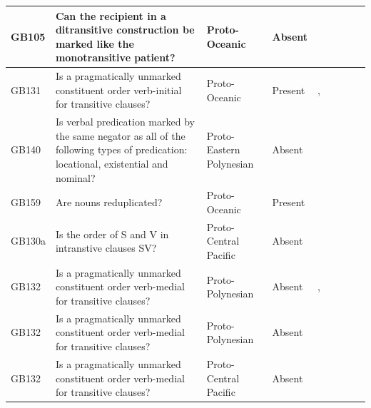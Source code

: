 \documentclass[draft,10pt]{article} %
\begin{document}
\begin{landscape}
\begin{longtable}{| p{2cm}| p{3cm}| p{2.5cm}|p{2cm}|p{2cm}|p{2cm}|p{2cm}|p{2cm}|p{2cm}|}
GB105&Can the recipient in a ditransitive construction be marked like the monotransitive patient?&Proto-Oceanic&Absent&\citet[118]{pawley1973some}& \cellcolor{hedvig_lightgreen!50}{True Negative} & \cellcolor{hedvig_yellow!50}{Half} & \cellcolor{hedvig_yellow!50}{Half} & \cellcolor{hedvig_yellow!50}{Half} \\ \hline
GB131&Is a pragmatically unmarked constituent order verb-initial for transitive clauses?&Proto-Oceanic&Present&\citet[118]{pawley1973some}, \citet[86]{lynchrosscrowley_proto_grammar_oceanic}& \cellcolor{hedvig_red!50}{False Negative} & \cellcolor{hedvig_yellow!50}{Half} & \cellcolor{hedvig_yellow!50}{False Negative} & \cellcolor{hedvig_lightgreen!50}{True Positive} \\ \hline
GB140&Is verbal predication marked by the same negator as all of the following types of predication: locational, existential and nominal?&Proto-Eastern Polynesian&Absent&\citet[130]{clark1976aspects}& \cellcolor{hedvig_lightgreen!50}{True Negative} & \cellcolor{hedvig_yellow!50}{Half} & \cellcolor{hedvig_red!50}{False Positive} & \cellcolor{hedvig_yellow!50}{Half} \\ \hline
GB159&Are nouns reduplicated?&Proto-Oceanic&Present&\citet[70]{lynchrosscrowley_proto_grammar_oceanic}& \cellcolor{hedvig_yellow!50}{Half} & \cellcolor{hedvig_yellow!50}{Half} & \cellcolor{hedvig_lightgreen!50}{True Positive} & \cellcolor{hedvig_yellow!50}{Half} \\ \hline
GB130a&Is the order of S and V in intranstive clauses SV?&Proto-Central Pacific&Absent&\citet[122]{kikusawa2002proto}& \cellcolor{hedvig_red!50}{False Positive} & \cellcolor{hedvig_yellow!50}{Half} & \cellcolor{hedvig_red!50}{False Positive} & \cellcolor{hedvig_yellow!50}{True Negative} \\ \hline
GB132&Is a pragmatically unmarked constituent order verb-medial for transitive clauses?&Proto-Polynesian&Absent&\cite[15]{chung1978}, \citet[118]{pawley1973some}& \cellcolor{hedvig_red!50}{False Positive} & \cellcolor{hedvig_yellow!50}{Half} & \cellcolor{hedvig_red!50}{False Positive} & \cellcolor{hedvig_yellow!50}{True Negative} \\ \hline
GB132&Is a pragmatically unmarked constituent order verb-medial for transitive clauses?&Proto-Polynesian&Absent&\citet[122]{kikusawa2002proto}& \cellcolor{hedvig_red!50}{False Positive} & \cellcolor{hedvig_yellow!50}{Half} & \cellcolor{hedvig_red!50}{False Positive} & \cellcolor{hedvig_yellow!50}{True Negative} \\ \hline
GB132&Is a pragmatically unmarked constituent order verb-medial for transitive clauses?&Proto-Central Pacific&Absent&\citet[122]{kikusawa2002proto}& \cellcolor{hedvig_red!50}{False Positive} & \cellcolor{hedvig_red!50}{False Positive} & \cellcolor{hedvig_red!50}{False Positive} & \cellcolor{hedvig_yellow!50}{True Negative} \\ \hline

\end{longtable}
\end{landscape}
\end{document}
